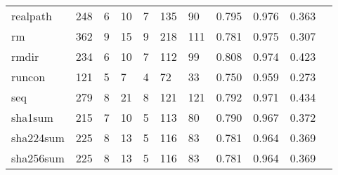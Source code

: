 \begin{longtable}{lp{1.10cm}p{1.10cm}p{1.10cm}p{1.10cm}p{1.10cm}p{1.10cm}p{1.10cm}p{1.10cm}p{1.10cm}p{1.10cm}}
realpath  &                    248 &                                  6 &                                10 &                                7 &                               135 &                              90 &                             0.795 &                                 0.976 &                               0.363 \\
rm        &                    362 &                                  9 &                                15 &                                9 &                               218 &                             111 &                             0.781 &                                 0.975 &                               0.307 \\
rmdir     &                    234 &                                  6 &                                10 &                                7 &                               112 &                              99 &                             0.808 &                                 0.974 &                               0.423 \\
runcon    &                    121 &                                  5 &                                 7 &                                4 &                                72 &                              33 &                             0.750 &                                 0.959 &                               0.273 \\
seq       &                    279 &                                  8 &                                21 &                                8 &                               121 &                             121 &                             0.792 &                                 0.971 &                               0.434 \\
sha1sum   &                    215 &                                  7 &                                10 &                                5 &                               113 &                              80 &                             0.790 &                                 0.967 &                               0.372 \\
sha224sum &                    225 &                                  8 &                                13 &                                5 &                               116 &                              83 &                             0.781 &                                 0.964 &                               0.369 \\
sha256sum &                    225 &                                  8 &                                13 &                                5 &                               116 &                              83 &                             0.781 &                                 0.964 &                               0.369 \\

\end{longtable}

